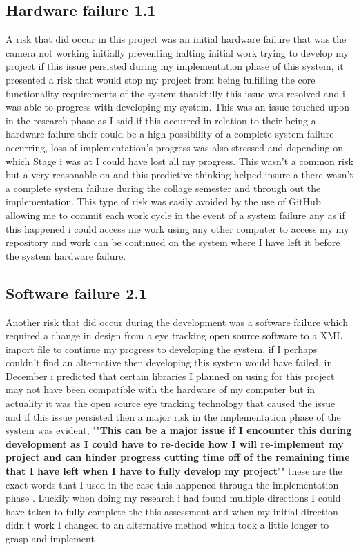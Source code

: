 \subsection{Hardware failure 1.1}
A risk that did occur in this project was an initial hardware failure that was the camera not working initially preventing   halting initial work  trying to develop my project  if this issue persisted during my implementation phase of this system, it presented a risk that would stop my project from being fulfilling  the  core functionality requirements of the system thankfully this issue was resolved and i was able to progress with developing my system. This was an  issue touched upon in the research phase as I said if this occurred in relation to  their being a hardware failure their could be a high possibility of a  complete system failure occurring, loss of  implementation's progress was also stressed and depending on which Stage i was at I  could have lost all my progress. This wasn't a  common risk but a very reasonable on and this predictive thinking helped  insure a  there wasn't a complete system failure during the collage semester and through out the implementation. This type of risk was easily avoided by the use of  GitHub allowing me to commit each work cycle  in the event of a system failure any as if this happened i could access me work  using any other computer to access my my repository and work can be continued on the system where I have left it before the system hardware failure.

\subsection{Software failure 2.1}
Another risk that did occur during the development was a software failure which required a change in design from a eye tracking open source software to a XML import file to continue  my progress to developing the system, if I perhaps couldn't find an alternative then developing this system would have failed, in December i predicted that certain libraries I planned on using for this project may not have been compatible with the hardware of my computer but in actuality it was the open source eye tracking technology that caused the issue and if this issue persisted then a major risk in the implementation phase of the system was evident, ""\textbf{This can be a major issue if I encounter this during development as I could have to re-decide how I will re-implement my project and can hinder progress cutting time off of the remaining time that I have left when I have to fully develop my project}"" these are the exact words that I used in  the case this happened through the implementation phase . Luckily when doing my research i had found multiple directions I could have taken to fully complete the this assessment and when my initial direction didn't work I changed to an alternative method which took a little longer to grasp and implement . 
